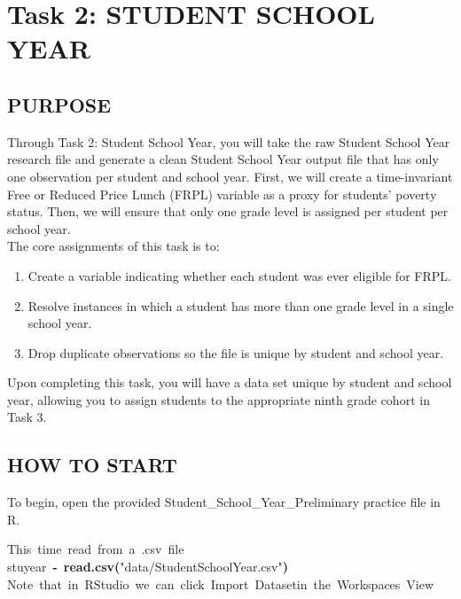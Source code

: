 \documentclass[12pt]{article}
\makeatletter
\newcommand{\hlfunctioncall}[1]{\textcolor[rgb]{0.501960784313725,0,0.329411764705882}{\textbf{#1}}}%
\newcommand{\hlstring}[1]{\textcolor[rgb]{0.6,0.6,1}{#1}}%
\newcommand{\hlkeyword}[1]{\textcolor[rgb]{0,0,0}{\textbf{#1}}}%
\newcommand{\hlcomment}[1]{\textcolor[rgb]{0.180392156862745,0.6,0.341176470588235}{#1}}%
\newcommand{\hlassignement}[1]{\textcolor[rgb]{0,0,0}{\textbf{#1}}}%
\newcommand{\hlsymbol}[1]{\textcolor[rgb]{0,0,0}{#1}}%
\newcommand{\hlstd}[1]{\textcolor[rgb]{0,0,0}{#1}}%
\newenvironment{kframe}{%
 \def\FrameCommand##1{\hskip\@totalleftmargin \hskip-\fboxsep
 \colorbox{shadecolor}{##1}\hskip-\fboxsep
     \hskip-\linewidth \hskip-\@totalleftmargin \hskip\columnwidth}%
 \MakeFramed {\advance\hsize-\width
   \@totalleftmargin\z@ \linewidth\hsize
   \@setminipage}}%
 {\par\unskip\endMakeFramed}
\newenvironment{knitrout}{}{} %
\renewenvironment{knitrout}{\begin{footnotesize}}{\end{footnotesize}}
\makeatother
\begin{document}
\section{Task 2: STUDENT SCHOOL YEAR}

\subsection{PURPOSE}
Through Task 2: Student School Year, you will take the raw Student School Year research file and generate a clean Student School 
Year output file that has only one observation per student and school year.  First, we will create a time-invariant Free or Reduced 
Price Lunch (FRPL) variable as a proxy for students' poverty status. Then, we will ensure that only one grade level is assigned 
per student per school year. \\
\noindent The core assignments of this task is to:
\begin{enumerate}
\setlength{\parskip}{-6pt}
\item Create a variable indicating whether each student was ever eligible for FRPL. 
\item Resolve instances in which a student has more than one grade level in a single school year.
\item Drop duplicate observations so the file is unique by student and school year.
\end{enumerate}
Upon completing this task, you will have a data set unique by student and school year, allowing you to assign students to the 
appropriate ninth grade cohort in Task 3.

\subsection{HOW TO START}
To begin, open the provided Student\_School\_Year\_Preliminary practice file in R.
\begin{knitrout}
\color{fgcolor}\begin{kframe}
\begin{flushleft}
\ttfamily\noindent
\hlcomment{\usebox{\hlnormalsizeboxhash}{\ }This{\ }time{\ }read{\ }from{\ }a{\ }.csv{\ }file}\hspace*{\fill}\\
\hlstd{}\hlsymbol{stuyear}{\ }\hlassignement{\usebox{\hlnormalsizeboxlessthan}-}{\ }\hlfunctioncall{read.csv}\hlkeyword{(}\hlstring{"{}data/Student\usebox{\hlnormalsizeboxunderscore}School\usebox{\hlnormalsizeboxunderscore}Year.csv"{}}\hlkeyword{)}\hspace*{\fill}\\
\hlstd{}\hlcomment{\usebox{\hlnormalsizeboxhash}{\ }Note{\ }that{\ }in{\ }RStudio{\ }we{\ }can{\ }click{\ }\usebox{\hlnormalsizeboxsinglequote}Import{\ }Dataset\usebox{\hlnormalsizeboxsinglequote}{\ }in{\ }the{\ }Workspaces{\ }View}\mbox{}
\normalfont
\end{flushleft}
\end{kframe}
\end{knitrout}
\end{document}
